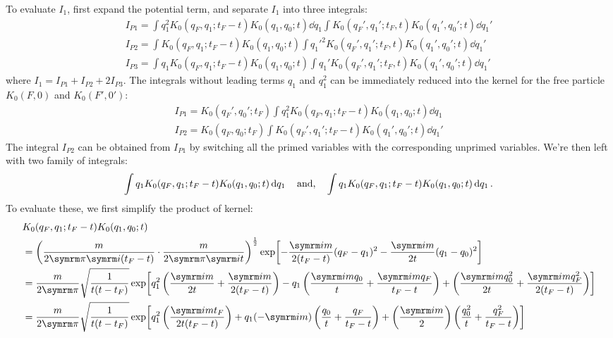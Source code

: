 To evaluate $I_1$, first expand the potential term, and separate $I_1$ into three integrals:
\begin{gather}
    I_{P1} = \int q_1^2K_0(q_F, q_1; t_F - t)K_0(q_1, q_0; t)\dd{q_1} \int K_0(q_F', q_1'; t_F, t)K_0(q_1', q_0'; t)\dd{q_1'} \label{eq:spring_IP1}\\
    I_{P2} = \int K_0(q_F, q_1; t_F - t)K_0(q_1, q_0; t) \int q_1'^2K_0(q_F', q_1'; t_F, t)K_0(q_1', q_0'; t)\dd{q_1'} \label{eq:spring_IP2}\\
    I_{P3} = \int q_1K_0(q_F, q_1; t_F - t)K_0(q_1, q_0; t) \int q_1'K_0(q_F', q_1'; t_F, t)K_0(q_1', q_0'; t) \dd{q_1'} \label{eq:spring_IP3}
\end{gather}
where $I_1 = I_{P1} + I_{P2} + 2I_{P3}$. The integrals without leading terms $q_1$ and $q_1^2$ can be immediately reduced into the kernel for the free particle $K_0(F, 0)$ and $K_0(F', 0')$:
\begin{gather}
    I_{P1} = K_0(q_F', q_0'; t_F)\int q_1^2K_0(q_F, q_1; t_F - t)K_0(q_1, q_0; t)\dd{q_1} \\
    I_{P2} = K_0(q_F, q_0; t_F)\int K_0(q_F', q_1'; t_F - t)K_0(q_1', q_0'; t)\dd{q_1'}
\end{gather}
The integral $I_{P2}$ can be obtained from $I_{P1}$ by switching all the primed variables with the corresponding unprimed variables. We're then left with two family of integrals:
\begin{equation}
    \int q_1K_0(q_F, q_1; t_F - t)K_0(q_1, q_0; t)\dd{q_1} \quad\textrm{and,}\quad \int q_1K_0(q_F, q_1; t_F - t)K_0(q_1, q_0; t)\dd{q_1}. \label{eq:family_of_integrals}
\end{equation}
To evaluate these, we first simplify the product of kernel:
\begin{align}
    &K_0(q_F, q_1; t_F - t)K_0(q_1, q_0; t) \nonumber\\
    &= \left(\frac{m}{2\cpi\im(t_F - t)} \cdot \frac{m}{2\cpi\im t}\right)^{\frac{1}{2}} \exp[-\frac{\im m}{2(t_F - t)}(q_F - q_1)^2 - \frac{\im m}{2t}(q_1 - q_0)^2] \\
    &= \frac{m}{2\cpi}\sqrt{\frac{1}{t(t - t_F)}} \exp[q_1^2\left(\frac{\im m}{2t} + \frac{\im m}{2(t_F - t)}\right) - q_1\left(\frac{\im m q_0}{t} + \frac{\im m q_F}{t_F - t}\right) + \left(\frac{\im m q_0^2}{2t} + \frac{\im m q_F^2}{2(t_F - t)}\right)] \nonumber \\
    &= \frac{m}{2\cpi}\sqrt{\frac{1}{t(t - t_F)}} \exp[q_1^2\left(\frac{\im m t_F}{2t(t_F - t)}\right) + q_1(-\im m)\left(\frac{q_0}{t} + \frac{q_F}{t_F - t}\right) + \left(\frac{\im m}{2}\right)\left(\frac{q_0^2}{t} + \frac{q_F^2}{t_F - t}\right)] \nonumber
\end{align}
